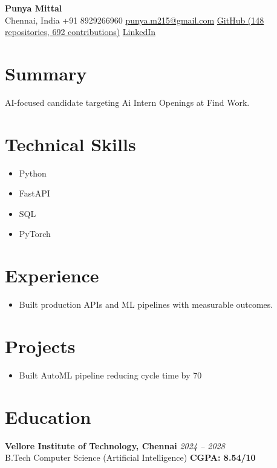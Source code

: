 \documentclass[a4paper,9.5pt]{article}
\begin{document}
\begin{center}
{\Large\textbf{\textcolor{accent}{Punya Mittal}}}\\[2pt]
{\small
  Chennai, India \textbar{} +91 8929266960 \textbar{}
  \href{mailto:punya.m215@gmail.com}{punya.m215@gmail.com} \textbar{}
  \href{https://github.com/Punyamittal}{GitHub (148 repositories, 692 contributions)} \textbar{}
  \href{https://linkedin.com/in/punyamittal}{LinkedIn}
}
\end{center}

\vspace{2pt}

\section*{Summary}
{\small
AI-focused candidate targeting Ai Intern Openings at Find Work.
}

\section*{Technical Skills}
{\small
\begin{itemize}
\item Python \item FastAPI \item SQL \item PyTorch
\end{itemize}
}

\section*{Experience}
\begin{itemize}
\item Built production APIs and ML pipelines with measurable outcomes.
\end{itemize}

\section*{Projects}
\begin{itemize}
\item Built AutoML pipeline reducing cycle time by 70%
\end{itemize}

\section*{Education}
\noindent\textbf{Vellore Institute of Technology, Chennai} \hfill \textit{2024 -- 2028}\\
{\small B.Tech Computer Science (Artificial Intelligence) \hfill \textbf{CGPA: 8.54/10}}
\end{document}
